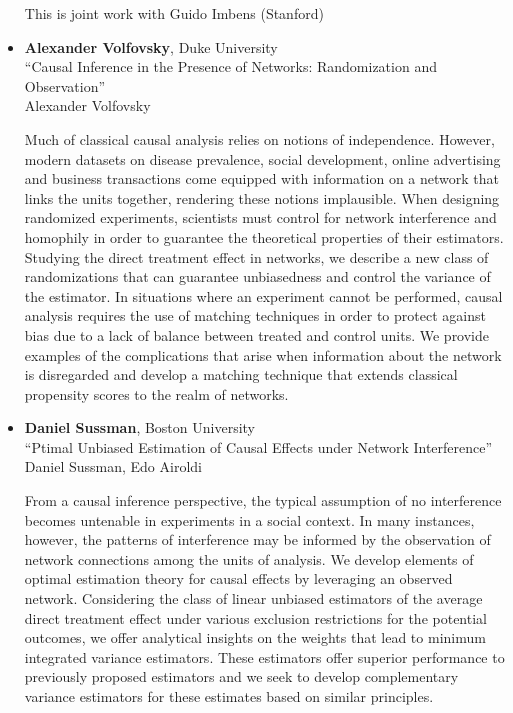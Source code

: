 \begin{itemize}
This is joint work with Guido Imbens (Stanford)

\item \textbf{Alexander Volfovsky}, Duke University \\
``Causal Inference in the Presence of Networks: Randomization and Observation'' \\
Alexander Volfovsky


Much of classical causal analysis relies on notions of independence. However, modern datasets on disease prevalence, social development, online advertising and business transactions come equipped with information on a network that links the units together, rendering these notions implausible. When designing randomized experiments, scientists must control for network interference and homophily in order to guarantee the theoretical properties of their estimators. Studying the direct treatment effect in networks, we describe a new class of randomizations that can guarantee unbiasedness and control the variance of the estimator. In situations where an experiment cannot be performed, causal analysis requires the use of matching techniques in order to protect against bias due to a lack of balance between treated and control units. We provide examples of the complications that arise when information about the network is disregarded and develop a matching technique that extends classical propensity scores to the realm of networks.

\item \textbf{Daniel Sussman}, Boston University \\
``Ptimal Unbiased Estimation of Causal Effects under Network Interference'' \\
Daniel Sussman, Edo Airoldi


From a causal inference perspective, the typical assumption of no interference becomes untenable in experiments in a social context. In many instances, however, the patterns of interference may be informed by the observation of network connections among the units of analysis. We develop elements of optimal estimation theory for causal effects by leveraging an observed network. Considering the class of linear unbiased estimators of the average direct treatment effect under various exclusion restrictions for the potential outcomes, we offer analytical insights on the weights that lead to minimum integrated variance estimators. These estimators offer superior performance to previously proposed estimators and we seek to develop complementary variance estimators for these estimates based on similar principles.

\end{itemize}

